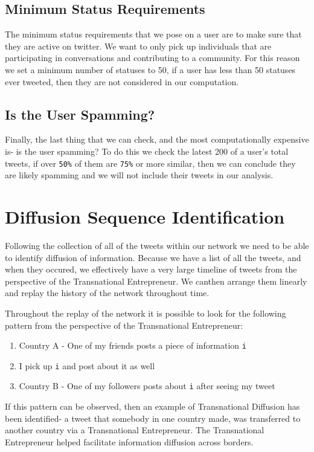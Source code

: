 \subsection{Minimum Status Requirements}
The minimum status requirements that we pose on a user are to make
sure that they are active on twitter. We want to only pick up
individuals that are participating in conversations and contributing
to a community. For this reason we set a minimum number of statuses to
50, if a user has less than 50 statuses ever tweeted, then they are
not considered in our computation.

\subsection{Is the User Spamming?}
Finally, the last thing that we can check, and the most
computationally expensive is- is the user spamming? To do this we
check the latest 200 of a user's total tweets, if over \verb|50%| of
them are \verb|75%| or more similar, then we can conclude they are
likely spamming and we will not include their tweets in our analysis.

\section{Diffusion Sequence Identification}
Following the collection of all of the tweets within our network we
need to be able to identify diffusion of information. Because we have
a list of all the tweets, and when they occured, we effectively have a
very large timeline of tweets from the perspective of the
Transnational Entrepreneur. We canthen arrange them linearly and
replay the history of the network throughout time.

Throughout the replay of the network it is possible to look for the
following pattern from the perspective of the Transnational
Entrepreneur:

\begin{enumerate}
\item Country A - One of my friends posts a piece of information \verb|i| 
\item I pick up \verb|i| and post about it as well
\item Country B - One of my followers posts about \verb|i| after seeing my tweet
\end{enumerate}

If this pattern can be observed, then an example of Transnational
Diffusion has been identified- a tweet that somebody in one country
made, was transferred to another country via a Transnational
Entrepreneur. The Transnational Entrepreneur helped facilitate
information diffusion across borders.

